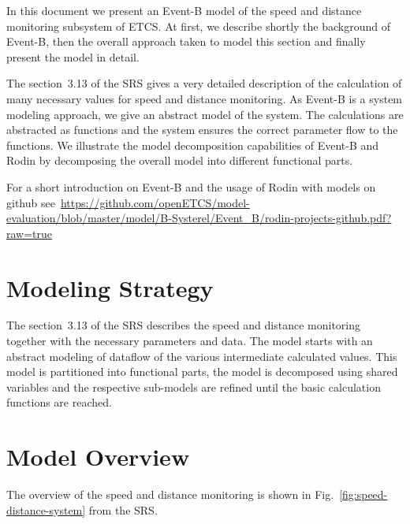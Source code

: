 \documentclass{template/openetcs_article}
\begin{document}
In this document we present an Event-B model of the speed and distance
monitoring subsystem of ETCS. At first, we describe shortly the background of
Event-B, then the overall approach taken to model this section and finally
present the model in detail.

The section~3.13 of the SRS gives a very detailed description of the calculation
of many necessary values for speed and distance monitoring. As Event-B is a
system modeling approach, we give an abstract model of the system. The
calculations are abstracted as functions and the system ensures the correct
parameter flow to the functions. We illustrate the model decomposition
capabilities of Event-B and Rodin by decomposing the overall model into
different functional parts.

For a short introduction on Event-B and the usage of Rodin with models on github
see~\url{https://github.com/openETCS/model-evaluation/blob/master/model/B-Systerel/Event_B/rodin-projects-github.pdf?raw=true}


\section{Modeling Strategy}
\label{sec:modeling-strategy}

The section~3.13 of the SRS describes the speed and distance monitoring together
with the necessary parameters and data. The model starts with an abstract
modeling of dataflow of the various intermediate calculated values. This model
is partitioned into functional parts, the model is decomposed using shared
variables and the respective sub-models are refined until the basic calculation
functions are reached.

\section{Model Overview}
\label{sec:model-overview}

The overview of the speed and distance monitoring is shown in
Fig.~\ref{fig:speed-distance-system} from the SRS.
\end{document}

